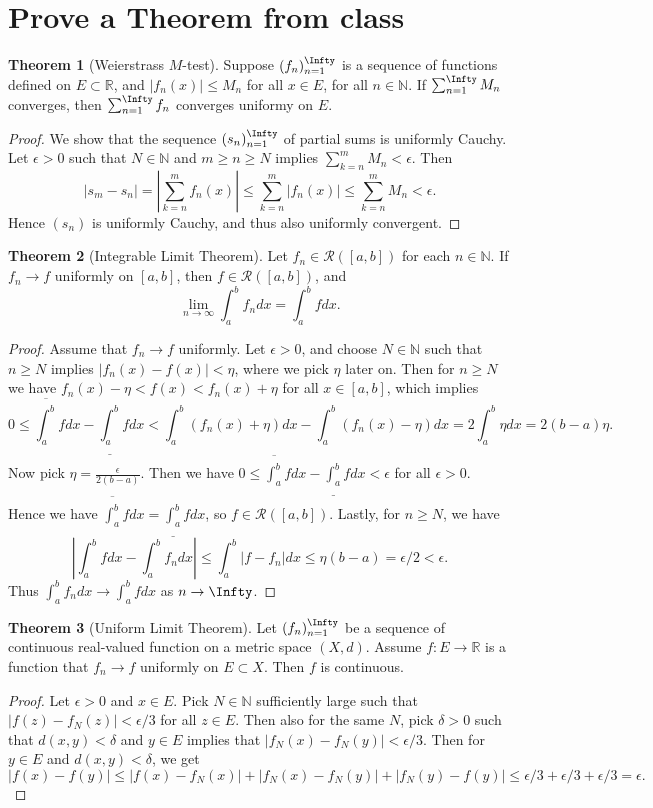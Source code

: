 \documentclass[oneside]{amsart}
\theoremstyle{definition}
\newtheorem{theorem}{Theorem}[section]
\newcommand{\rr}{\mathbb R}
\newcommand{\nn}{\mathbb N}
\begin{document}
\section{Prove a Theorem from class}

\begin{theorem}[Weierstrass $M$-test] Suppose $(f_n)_{n=1}^\Infty$ is a sequence of functions defined on $E \subset \rr$, and $|f_n(x)|\leq M_n$ for all $x \in E$, for all $n \in \nn$. If $\sum_{n=1}^\Infty M_n$ converges, then $\sum_{n=1}^\Infty f_n$ converges uniformy on $E$.
\end{theorem}
\begin{proof}
	We show that the sequence $(s_n)_{n=1}^\Infty$ of partial sums is uniformly Cauchy. Let $\epsilon > 0$ such that $N \in \nn$ and $m \geq n \geq N$ implies $\sum_{k=n}^m M_n < \epsilon$. Then
	\[|s_m - s_n | = |\sum_{k=n}^m f_n(x)| \leq \sum_{k=n}^m |f_n(x)| \leq \sum_{k=n}^m M_n < \epsilon.
	\] Hence $(s_n)$ is uniformly Cauchy, and thus also uniformly convergent. 
\end{proof}
\begin{theorem}[Integrable Limit Theorem] Let $f_n \in \mathcal R([a,b])$ for each $n \in \nn$. If $f_n \to f$ uniformly on $[a,b]$, then $f \in \mathcal R([a,b])$, and $$ \lim _{n\to \infty} \int_a^b f_n dx = \int_a^b f dx.$$
\begin{proof}
	Assume that $f_n \to f$ uniformly. Let $\epsilon > 0$, and choose $N \in \nn$ such that $n \geq N$ implies $|f_n(x) -f(x) |< \eta$, where we pick $\eta$ later on. Then for $n\geq N$ we have $f_n(x) - \eta < f(x) < f_n (x) + \eta$ for all $x \in [a,b]$, which implies $$ 0 \leq \overline{\int_a^b} fdx - \underline{\int_a^b} f dx < \int_a^b (f_n(x)+\eta ) dx-\int_a^b (f_n(x) -\eta) dx = 2\int_a^b \eta dx = 2(b-a)\eta .$$ Now pick $\eta = \frac{\epsilon}{2(b-a)}$. Then we have $0 \leq \overline{\int_a^b} fdx -\underline{\int_a^b} f dx < \epsilon$ for all $\epsilon > 0$. Hence we have $\overline{\int_a^b} f dx = \underline{\int_a^b} f dx$, so $f \in \mathcal R([a,b])$. Lastly, for $n \geq N$, we have 
	\[
	|\int_a^b f dx - \int_a^b f_n dx| \leq \int_a^b |f-f_n| dx \leq \eta (b-a) = \epsilon/2 < \epsilon.
	\] Thus $\int_a^b f_n dx \to \int_a^b f dx$ as $n \to \Infty$.
\end{proof}
\end{theorem}
\begin{theorem}[Uniform Limit Theorem] Let $(f_n)_{n=1}^\Infty$ be a sequence of continuous real-valued function on a metric space $(X,d)$. Assume $f\colon E \to \rr$ is a function that $f_n \to f$ uniformly on $E \subset X$. Then $f$ is continuous.
\end{theorem}
\begin{proof} Let $\epsilon > 0$ and $x \in E$. Pick $N \in \nn$ sufficiently large such that $|f(z) - f_N(z)| < \epsilon /3$ for all $z \in E$. Then also for the same $N$, pick $\delta > 0$ such that $d(x,y)< \delta$ and $y \in E$ implies that $|f_N(x)-f_N(y)| < \epsilon/3$. Then for $y \in E$ and $d(x,y)<\delta$, we get 
\[
|f(x)-f(y)| \leq |f(x) - f_N(x) | + |f_N(x) -f_N(y)| + |f_N(y)-f(y)| \leq \epsilon/3+\epsilon/3+\epsilon/3 = \epsilon.
\]
\end{proof}
\end{document}
